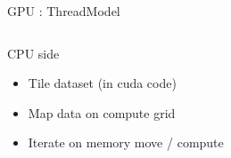 \begin{Frame}{GPU : ThreadModel}
 \begin{columns}[t]
  \begin{column}{\BW}
    \begin{block}{CPU side}
      \begin{itemize}
      \item Tile dataset (in cuda code)
      \item Map data on compute grid
      \item Iterate on memory move / compute
      \end{itemize}
    \end{block}
  \end{column}
  \begin{column}{\BW}
    \begin{block}{}
    \end{block}
  \end{column}

 \end{columns}
\end{Frame}
